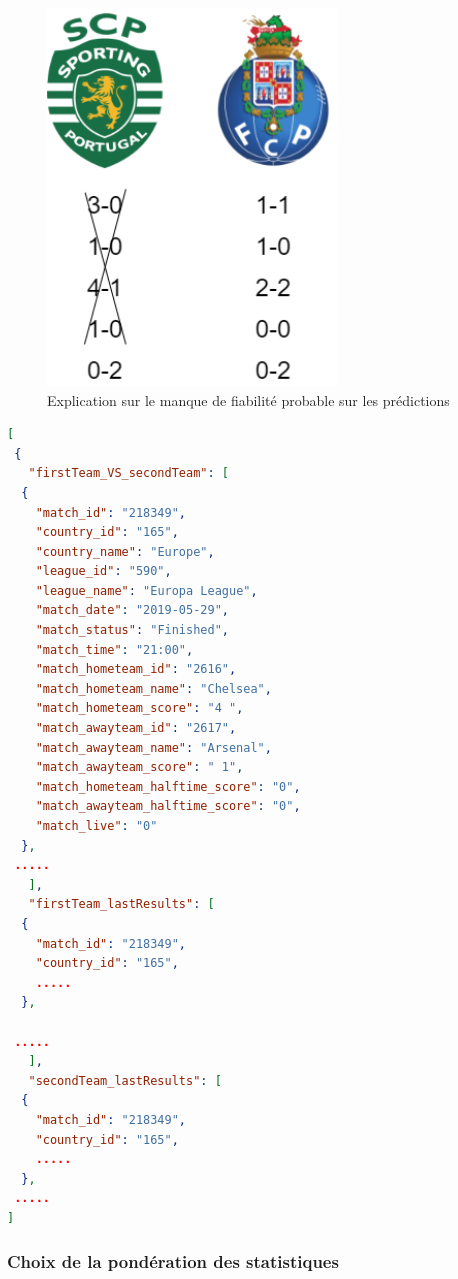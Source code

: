 \documentclass[a4paper,14pt]{extarticle}
\begin{document}
{\begin{figure}[H]
    \centering
    \includegraphics[height=10cm]{../img/explicationStatsManquante.png}
    \caption{Explication sur le manque de fiabilité probable sur les prédictions}
    \label{fig:explicationStatsManquante}
\end{figure}


\newpage

\begin{lstlisting}[language=json, firstnumber=1, caption=Aperçu du JSON de l'endpoint H2H, captionpos=b, label=apercuJSON]
[
 {
   "firstTeam_VS_secondTeam": [
  {
    "match_id": "218349",
    "country_id": "165",
    "country_name": "Europe",
    "league_id": "590",
    "league_name": "Europa League",
    "match_date": "2019-05-29",
    "match_status": "Finished",
    "match_time": "21:00",
    "match_hometeam_id": "2616",
    "match_hometeam_name": "Chelsea",
    "match_hometeam_score": "4 ",
    "match_awayteam_id": "2617",
    "match_awayteam_name": "Arsenal",
    "match_awayteam_score": " 1",
    "match_hometeam_halftime_score": "0",
    "match_awayteam_halftime_score": "0",
    "match_live": "0"
  },
 .....
   ],
   "firstTeam_lastResults": [
  {
    "match_id": "218349",
    "country_id": "165",
    .....
  },
  
 .....
   ],
   "secondTeam_lastResults": [
  {
    "match_id": "218349",
    "country_id": "165",
    .....
  },
 .....
]
\end{lstlisting}

\newpage

\subsubsection{Choix de la pondération des statistiques}
\label{choixPondStat}

}
\end{document}
